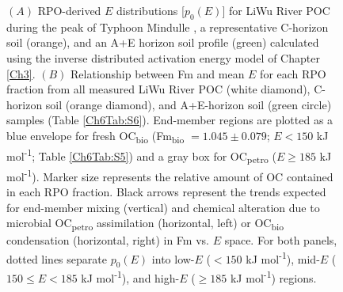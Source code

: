 \begin{figure}[p]
	\caption[RPO $p_{0}(E)$ distributions and $E$ vs. Fm plots]{$(A)$ RPO-derived $E$ distributions [$p_{0}(E)$] for LiWu River POC during the peak of Typhoon Mindulle \citep[white;][]{Hilton:2008fo}, a representative C-horizon soil (orange), and an A+E horizon soil profile (green) calculated using the inverse distributed activation energy model of Chapter \ref{Ch3}. $(B)$ Relationship between Fm and mean $E$ for each RPO fraction from all measured LiWu River POC (white diamond), C-horizon soil (orange diamond), and A+E-horizon soil (green circle) samples (Table \ref{Ch6Tab:S6}). End-member regions are plotted as a blue envelope for fresh OC\textsubscript{bio} (Fm\textsubscript{bio} $= 1.045 \pm 0.079$; $E < 150$ kJ mol\textsuperscript{-1}; Table \ref{Ch6Tab:S5}) and a gray box for OC\textsubscript{petro} ($E \geq 185$ kJ mol\textsuperscript{-1}). Marker size represents the relative amount of OC contained in each RPO fraction. Black arrows represent the trends expected for end-member mixing (vertical) and chemical alteration due to microbial OC\textsubscript{petro} assimilation (horizontal, left) or OC\textsubscript{bio} condensation (horizontal, right) in Fm vs. $E$ space. For both panels, dotted lines separate $p_{0}(E)$ into low-$E$ ($<150$ kJ mol\textsuperscript{-1}), mid-$E$ ($150 \leq E < 185$ kJ mol\textsuperscript{-1}), and high-$E$ ($\geq 185$ kJ mol\textsuperscript{-1}) regions.}
	\label{Ch6Fig:2} 
\end{figure}

